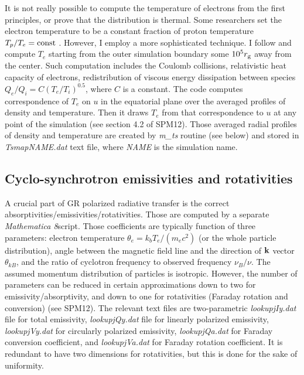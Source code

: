 \documentclass{emulateapj}
\newcommand{\mat}{\textit{Mathematica 8}}
\begin{document}
It is not really possible to compute the temperature of electrons from the first principles, or prove that the distribution is thermal.
Some researchers set the electron temperature to be a constant fraction of proton temperature $T_p/T_e=\rm const$ \citep{Moscibrodzka:2009,Dexter:2010lk}.
However, I employ a more sophisticated technique. I follow \citet{Sharma_heating:2007} and compute $T_e$ starting from the outer simulation boundary
some $10^5r_{\rm g}$ away from the center. Such computation includes the Coulomb collisions, relativistic heat capacity of electrons,
redistribution of viscous energy dissipation between species $Q_e/Q_i=C(T_e/T_i)^{0.5}$, where $C$ is a constant.
The code computes correspondence of $T_e$ on $u$ in the equatorial plane over the averaged profiles of density and temperature.
Then it draws $T_e$ from that correspondence to $u$ at any point of the simulation (see section 4.2 of SPM12).
Those averaged radial profiles of density and temperature are created by \textit{m\_ts} routine (see below) and stored in \textit{TsmapNAME.dat} text file,
where \textit{NAME} is the simulation name.

\subsection{Cyclo-synchrotron emissivities and rotativities}
A crucial part of GR polarized radiative transfer is the correct absorptivities/emissivities/rotativities.
Those are computed by a separate \mat script. Those coefficients are typically function of three parameters:
electron temperature $\theta_e=k_b T_e/(m_e c^2)$ (or the whole particle distribution), angle between the magnetic field line and the direction of ${\bf k}$ vector
$\theta_{kB}$, and the ratio of cyclotron frequency to observed frequency $\nu_B/\nu$. The assumed momentum distribution of particles is isotropic.
However, the number of parameters can be reduced in certain approximations down to two for emissivity/absorptivity, and down to one for rotativities
(Faraday rotation and conversion) (see SPM12). The relevant text files are two-parametric \textit{lookupjIy.dat} file for total emissivity,
\textit{lookupjQy.dat} file for linearly polarized emissivity, \textit{lookupjVy.dat} for circularly polarized emissivity, \textit{lookupjQa.dat}
for Faraday conversion coefficient, and \textit{lookupjVa.dat} for Faraday rotation coefficient. It is redundant to have two dimensions for rotativities,
but this is done for the sake of uniformity.
\end{document}
